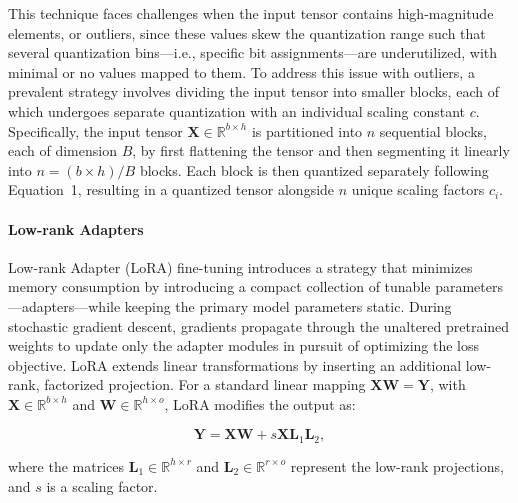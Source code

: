 This technique faces challenges when the input tensor contains high-magnitude elements, or outliers, since these values skew the quantization range such that several quantization bins—i.e., specific bit assignments—are underutilized, with minimal or no values mapped to them. To address this issue with outliers, a prevalent strategy involves dividing the input tensor into smaller blocks, each of which undergoes separate quantization with an individual scaling constant $c$. Specifically, the input tensor $\mathbf{X}\in \mathbb{R}^{b\times h}$ is partitioned into $n$ sequential blocks, each of dimension $B$, by first flattening the tensor and then segmenting it linearly into ${n = ({b\times h} )/{B} }$ blocks. Each block is then quantized separately following Equation~1, resulting in a quantized tensor alongside $n$ unique scaling factors $c_i$.

\paragraph{Low-rank Adapters} Low-rank Adapter (LoRA) fine-tuning \citep{hu2021lora} introduces a strategy that minimizes memory consumption by introducing a compact collection of tunable parameters—adapters—while keeping the primary model parameters static. During stochastic gradient descent, gradients propagate through the unaltered pretrained weights to update only the adapter modules in pursuit of optimizing the loss objective. LoRA extends linear transformations by inserting an additional low-rank, factorized projection. For a standard linear mapping $\mathbf{X} \mathbf{W} = \mathbf{Y}$, with $\mathbf{X}\in  \mathbb{R}^{b\times h}$ and $\mathbf{W}\in  \mathbb{R}^{h\times o}$, LoRA modifies the output as:

\begin{equation}
    \mathbf{Y} = \mathbf{X}\mathbf{W} + s\mathbf{X}\mathbf{L}_1\mathbf{L}_2,
\end{equation}

where the matrices $\mathbf{L}_1\in  \mathbb{R}^{h\times r}$ and $\mathbf{L}_2\in  \mathbb{R}^{r\times o}$ represent the low-rank projections, and $s$ is a scaling factor.

